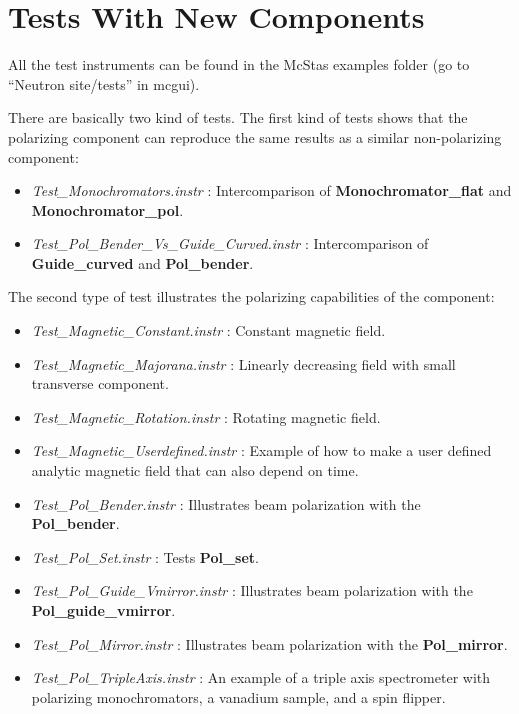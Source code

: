 \section{Tests With New Components}
\label{sec:test}

All the test instruments can be found in the McStas examples folder
(go to ``Neutron site/tests'' in mcgui). 

There are basically two kind of tests. The first kind of tests shows
that the polarizing component can reproduce the same results as a
similar non-polarizing component:
\begin{itemize} 
\item \textit{Test\_Monochromators.instr} : Intercomparison of
  \textbf{Monochromator\_flat} and \textbf{Monochromator\_pol}. 
\item \textit{Test\_Pol\_Bender\_Vs\_Guide\_Curved.instr} : Intercomparison of
  \textbf{Guide\_curved} and \textbf{Pol\_bender}.
\end{itemize}

The second type of test illustrates the polarizing capabilities of the
component:
\begin{itemize}
\item \textit{Test\_Magnetic\_Constant.instr} : Constant magnetic field. 
\item \textit{Test\_Magnetic\_Majorana.instr} : Linearly decreasing field with
  small transverse component.
\item \textit{Test\_Magnetic\_Rotation.instr} : Rotating magnetic field. 
\item \textit{Test\_Magnetic\_Userdefined.instr} : Example of how to make a
  user defined analytic magnetic field that can also depend on time. 
\item \textit{Test\_Pol\_Bender.instr} : Illustrates beam polarization with
  the \textbf{Pol\_bender}.
\item \textit{Test\_Pol\_Set.instr} : Tests \textbf{Pol\_set}. 
\item \textit{Test\_Pol\_Guide\_Vmirror.instr} : Illustrates beam polarization
  with the \textbf{Pol\_guide\_vmirror}.
\item \textit{Test\_Pol\_Mirror.instr} : Illustrates beam polarization
  with the \textbf{Pol\_mirror}.
\item \textit{Test\_Pol\_TripleAxis.instr} : An example of a triple axis
  spectrometer with polarizing monochromators, a vanadium sample, and a spin
  flipper.
\end{itemize}
    
